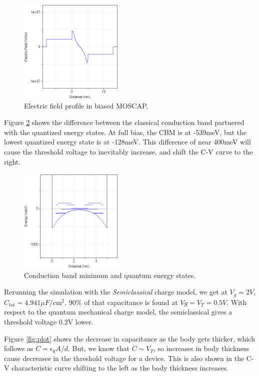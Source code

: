 \documentclass{IEEEtran}
\begin{document}
\begin{figure}[!ht] 
    \centering
    \includegraphics*[width = 5cm]{ElectricFieldBiased.png}
    \caption{Electric field profile in biased MOSCAP.}
    \label{fig:electricfield}
\end{figure}    

Figure \ref{fig:quantized} shows the difference between the classical conduction band partnered with the quantized energy states. At full bias, the CBM is at -539meV, but the lowest quantized energy state is at -128meV. This difference of near 400meV will cause the threshold voltage to inevitably increase, and shift the C-V curve to the right.

\begin{figure}[!ht] 
    \centering
    \includegraphics*[width = 5cm]{SpatialSubbands.png}
    \caption{Conduction band minimum and quantum energy states.}
    \label{fig:quantized}
\end{figure}    

Rerunning the simulation with the \textit{Semiclassical} charge model, we get at \(V_g = 2V\), \(C_{tot} = 4.941 \mu F/\text{cm}^2\). 90\% of that capacitance is found at \(Vg=V_T = 0.5V\). With respect to the quantum mechanical charge model, the semiclassical gives a threshold voltage 0.2V lower.

Figure \ref{fig:plot} shows the decrease in capacitance as the body gets thicker, which follows as \(C = \epsilon_0 A / d\). But, we know that \(C \sim V_T\), so increases in body thickness cause decreases in the threshold voltage for a device. This is also shown in the C-V characteristic curve shifting to the left as the body thickness increases. 
\end{document}
